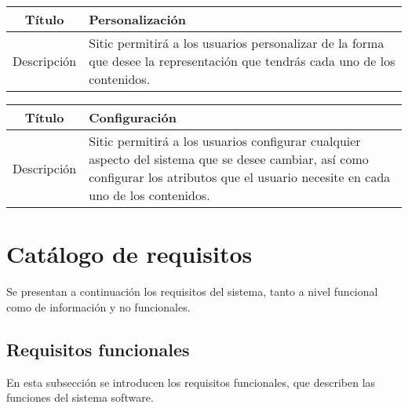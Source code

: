 \begin{center}

    \begin{tabularx}{\textwidth}{|c|X|}
        \hline
        Título & Personalización \\

        \hline

        Descripción & Sitic permitirá a los usuarios personalizar de la forma que
        desee la representación que tendrás cada uno de los contenidos. \\

        \hline
    \end{tabularx}
\end{center}

\begin{center}

    \begin{tabularx}{\textwidth}{|c|X|}
        \hline
        Título & Configuración \\

        \hline

        Descripción & Sitic permitirá a los usuarios configurar cualquier aspecto
        del sistema que se desee cambiar, así como configurar los atributos
        que el usuario necesite en cada uno de los contenidos. \\

        \hline
    \end{tabularx}
\end{center}


\section{Catálogo de requisitos}

Se presentan a continuación los requisitos del sistema, tanto a nivel funcional
como de información y no funcionales.

\subsection{Requisitos funcionales}

En esta subsección se introducen los requisitos funcionales, que describen las funciones
del sistema software.


